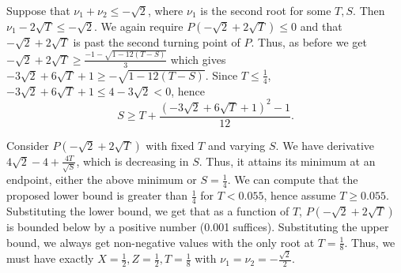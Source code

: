 \documentclass[11pt]{article}
\begin{document}
Suppose that $\nu_1 + \nu_2 \le -\sqrt{2}$, where $\nu_1$ is the second root for some $T, S$. Then $\nu_1 - 2\sqrt{T} \le -\sqrt{2}$. We again require $P(-\sqrt{2} + 2\sqrt{T}) \le 0$ and that $-\sqrt{2} + 2\sqrt{T}$ is past the second turning point of $P$. Thus, as before we get $-\sqrt{2} + 2\sqrt{T} \ge \frac{-1-\sqrt{1-12(T-S)}}{3}$ which gives $-3\sqrt{2} + 6\sqrt{T} + 1 \ge -\sqrt{1-12(T-S)}$. Since $T \le \frac14$, $-3\sqrt{2} + 6\sqrt{T} + 1 \le 4-3\sqrt{2} < 0$, hence
\[S \ge T + \frac{(-3\sqrt{2} + 6\sqrt{T} + 1)^2 - 1}{12}.\]

Consider $P(-\sqrt{2} + 2\sqrt{T})$ with fixed $T$ and varying $S$. We have derivative $4\sqrt{2} - 4 + \frac{4T}{\sqrt{S}}$, which is decreasing in $S$. Thus, it attains its minimum at an endpoint, either the above minimum or $S = \frac14$. We can compute that the proposed lower bound is greater than $\frac14$ for $T < 0.055$, hence assume $T \ge 0.055$. Substituting the lower bound, we get that as a function of $T$, $P(-\sqrt{2} + 2\sqrt{T})$ is bounded below by a positive number (0.001 suffices). Substituting the upper bound, we always get non-negative values with the only root at $T = \frac18$. Thus, we must have exactly $X = \frac12, Z = \frac12, T = \frac18$ with $\nu_1 = \nu_2 = -\frac{\sqrt{2}}{2}$. \\
\end{document}
